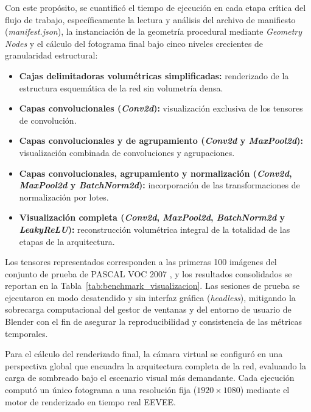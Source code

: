 Con este propósito, se cuantificó el tiempo de ejecución en cada etapa crítica del flujo de trabajo, específicamente la lectura y análisis 
del archivo de manifiesto (\textit{manifest.json}), la instanciación de la geometría procedural mediante \textit{Geometry Nodes} y 
el cálculo del fotograma final bajo cinco niveles crecientes de granularidad estructural:
\begin{itemize}
    \item \textbf{Cajas delimitadoras volumétricas simplificadas:} renderizado de la estructura esquemática de la red sin volumetría densa.
    \item \textbf{Capas convolucionales (\textit{Conv2d}):} visualización exclusiva de los tensores de convolución.
    \item \textbf{Capas convolucionales y de agrupamiento (\textit{Conv2d} y \textit{MaxPool2d}):} visualización combinada de 
    convoluciones y agrupaciones.
    \item \textbf{Capas convolucionales, agrupamiento y normalización (\textit{Conv2d}, \textit{MaxPool2d} y \textit{BatchNorm2d}):} 
    incorporación de las transformaciones de normalización por lotes.
    \item \textbf{Visualización completa (\textit{Conv2d}, \textit{MaxPool2d}, \textit{BatchNorm2d} y \textit{LeakyReLU}):} reconstrucción 
    volumétrica integral de la totalidad de las etapas de la arquitectura.
\end{itemize}

Los tensores representados corresponden a las primeras 100 imágenes del conjunto de prueba de PASCAL VOC 2007 \parencite{pascal_voc_2007}, y 
los resultados consolidados se reportan en la Tabla~\ref{tab:benchmark_visualizacion}. Las sesiones de prueba se ejecutaron en modo 
desatendido y sin interfaz gráfica (\textit{headless}), mitigando la sobrecarga computacional del gestor de ventanas y del entorno de 
usuario de Blender con el fin de asegurar la reproducibilidad y consistencia de las métricas temporales.
\medskip

Para el cálculo del renderizado final, la cámara virtual se configuró en una perspectiva global que encuadra la arquitectura completa de la 
red, evaluando la carga de sombreado bajo el escenario visual más demandante. Cada ejecución computó un único fotograma a una resolución 
fija ($1920\times1080$) mediante el motor de renderizado en tiempo real EEVEE.

